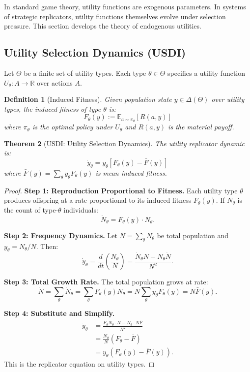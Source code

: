 \documentclass[12pt]{article}
\newtheorem{theorem}{Theorem}[section]
\newtheorem{definition}[theorem]{Definition}
\newcommand{\R}{\mathbb{R}}
\newcommand{\E}{\mathbb{E}}
\begin{document}
In standard game theory, utility functions are exogenous parameters. In systems of strategic replicators, utility functions themselves evolve under selection pressure. This section develops the theory of endogenous utilities.

\subsection{Utility Selection Dynamics (USDI)}

Let $\Theta$ be a finite set of utility types. Each type $\theta \in \Theta$ specifies a utility function $U_\theta: A \to \R$ over actions $A$.

\begin{definition}[Induced Fitness]
Given population state $y \in \Delta(\Theta)$ over utility types, the \emph{induced fitness} of type $\theta$ is:
\[
F_\theta(y) := \E_{a \sim \pi_\theta}[R(a, y)]
\]
where $\pi_\theta$ is the optimal policy under $U_\theta$ and $R(a, y)$ is the material payoff.
\end{definition}

\begin{theorem}[USDI: Utility Selection Dynamics]
\label{thm:usdi}
The utility replicator dynamic is:
\[
\dot{y}_\theta = y_\theta \left[ F_\theta(y) - \bar{F}(y) \right]
\]
where $\bar{F}(y) = \sum_\theta y_\theta F_\theta(y)$ is mean induced fitness.
\end{theorem}

\begin{proof}
\textbf{Step 1: Reproduction Proportional to Fitness.}
Each utility type $\theta$ produces offspring at a rate proportional to its induced fitness $F_\theta(y)$. If $N_\theta$ is the count of type-$\theta$ individuals:
\[
\dot{N}_\theta = F_\theta(y) \cdot N_\theta.
\]

\textbf{Step 2: Frequency Dynamics.}
Let $N = \sum_\theta N_\theta$ be total population and $y_\theta = N_\theta / N$. Then:
\[
\dot{y}_\theta = \frac{d}{dt} \left( \frac{N_\theta}{N} \right) = \frac{\dot{N}_\theta N - N_\theta \dot{N}}{N^2}.
\]

\textbf{Step 3: Total Growth Rate.}
The total population grows at rate:
\[
\dot{N} = \sum_\theta \dot{N}_\theta = \sum_\theta F_\theta(y) N_\theta = N \sum_\theta y_\theta F_\theta(y) = N \bar{F}(y).
\]

\textbf{Step 4: Substitute and Simplify.}
\begin{align*}
\dot{y}_\theta &= \frac{F_\theta N_\theta \cdot N - N_\theta \cdot N \bar{F}}{N^2} \\
&= \frac{N_\theta}{N} \left( F_\theta - \bar{F} \right) \\
&= y_\theta \left( F_\theta(y) - \bar{F}(y) \right).
\end{align*}
This is the replicator equation on utility types.
\end{proof}
\end{document}
